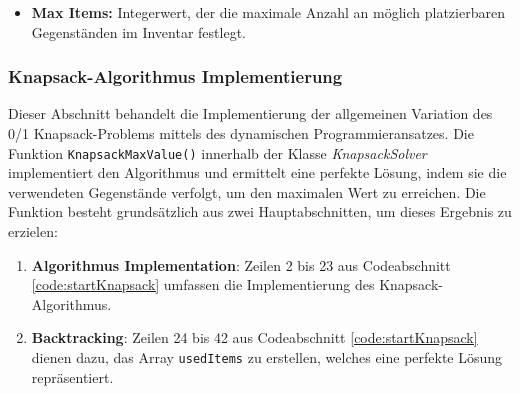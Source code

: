 \begin{itemize}
\begin{itemize}
    \item \textbf{Max Items:} Integerwert, der die maximale Anzahl an möglich platzierbaren Gegenständen im Inventar
    festlegt.
\end{itemize}

\subsubsection{Knapsack-Algorithmus Implementierung}
Dieser Abschnitt behandelt die Implementierung der allgemeinen Variation des 0/1 Knapsack-Problems mittels des dynamischen
Programmieransatzes. Die Funktion \texttt{KnapsackMaxValue()} innerhalb der Klasse \textit{KnapsackSolver} implementiert
den Algorithmus und ermittelt eine perfekte Lösung, indem sie die verwendeten Gegenstände verfolgt, um den maximalen Wert
zu erreichen. Die Funktion besteht grundsätzlich aus zwei Hauptabschnitten, um dieses Ergebnis zu erzielen:
\begin{enumerate}
    \item \textbf{Algorithmus Implementation}: Zeilen 2 bis 23 aus Codeabschnitt \ref{code:startKnapsack} umfassen die
    Implementierung des Knapsack-Algorithmus.

    \item \textbf{Backtracking}: Zeilen 24 bis 42 aus Codeabschnitt \ref{code:startKnapsack} dienen dazu, das Array
    \texttt{usedItems} zu erstellen, welches eine perfekte Lösung repräsentiert.
\end{enumerate}


\end{itemize}
